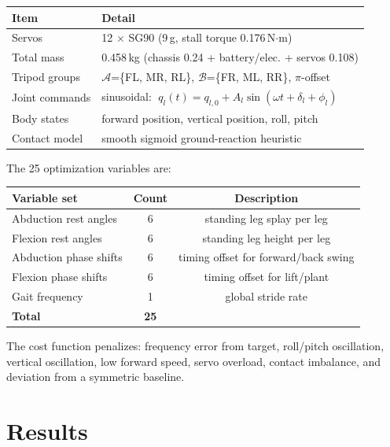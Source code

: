 \documentclass[11pt]{article}
\begin{document}
\begin{center}
\begin{tabular}{ll}
\toprule
\textbf{Item} & \textbf{Detail} \\
\midrule
Servos           & 12 $\times$ SG90 (9\,g, stall torque 0.176\,N$\cdot$m) \\
Total mass       & 0.458\,kg \;(chassis 0.24 + battery/elec.\;0.11 + servos 0.108) \\
Tripod groups    & $\mathcal{A}$=\{FL, MR, RL\},\; $\mathcal{B}$=\{FR, ML, RR\},\; $\pi$-offset \\
Joint commands   & sinusoidal: $\;q_l(t) = q_{l,0} + A_l\sin(\omega t + \delta_l + \phi_l)$ \\
Body states      & forward position, vertical position, roll, pitch \\
Contact model    & smooth sigmoid ground-reaction heuristic \\
\bottomrule
\end{tabular}
\end{center}

The 25 optimization variables are:

\begin{center}
\begin{tabular}{lcc}
\toprule
\textbf{Variable set} & \textbf{Count} & \textbf{Description} \\
\midrule
Abduction rest angles      & 6 & standing leg splay per leg \\
Flexion rest angles        & 6 & standing leg height per leg \\
Abduction phase shifts     & 6 & timing offset for forward/back swing \\
Flexion phase shifts       & 6 & timing offset for lift/plant \\
Gait frequency             & 1 & global stride rate \\
\midrule
\textbf{Total}             & \textbf{25} & \\
\bottomrule
\end{tabular}
\end{center}

The cost function penalizes: frequency error from target, roll/pitch oscillation, vertical oscillation, low forward speed, servo overload, contact imbalance, and deviation from a symmetric baseline.

\section{Results}
\end{document}
